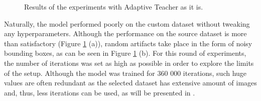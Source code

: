 \begin{figure}[htb]
    \centering
    \qquad
    \caption{Results of the experiments with Adaptive Teacher as it is.}\label{adapt_experiment1}%
\end{figure}

Naturally, the model performed poorly on the custom dataset without tweaking any hyperparameters. Although the performance on the source dataset is more than satisfactory (Figure \ref{adapt_experiment1} (a)), random artifacts take place in the form of noisy bounding boxes, as can be seen in Figure \ref{adapt_experiment1} (b). For this round of experiments, the number of iterations was set as high as possible in order to explore the limits of the setup. Although the model was trained for 360 000 iterations, such huge values are often redundant as the selected dataset has extensive amount of images and, thus, less iterations can be used, as will be presented in . 

